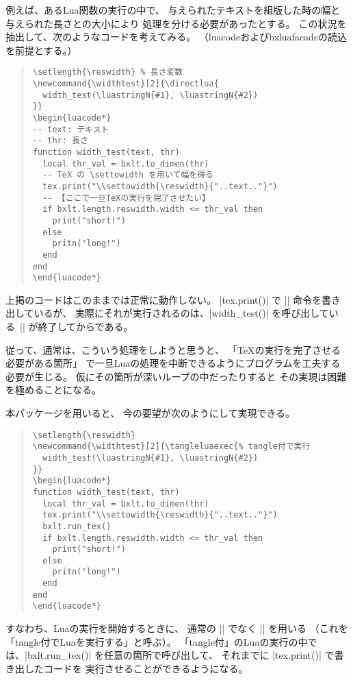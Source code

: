\documentclass[a4paper]{ltjsarticle}
\newcommand{\Pkg}[1]{\textsf{#1}}
\begin{document}
例えば、あるLua関数の実行の中で、
与えられたテキストを組版した時の幅と
与えられた長さとの大小により
処理を分ける必要があったとする。
この状況を抽出して、次のようなコードを考えてみる。
（\Pkg{luacode}および\Pkg{bxluafacade}の読込を前提とする。）

\begin{quote}\small\begin{verbatim}
\setlength{\reswidth} % 長さ変数
\newcommand{\widthtest}[2]{\directlua{
  width_test(\luastringN{#1}, \luastringN{#2})
}}
\begin{luacode*}
-- text: テキスト
-- thr: 長さ
function width_test(text, thr)
  local thr_val = bxlt.to_dimen(thr)
  -- TeX の \settowidth を用いて幅を得る
  tex.print("\\settowidth{\reswidth}{"..text.."}")
  -- 【ここで一旦TeXの実行を完了させたい】
  if bxlt.length.reswidth.width <= thr_val then
    print("short!")
  else
    pritn("long!")
  end
end
\end{luacode*}
\end{verbatim}\end{quote}

上掲のコードはこのままでは正常に動作しない。
|tex.print()| で |\settowidth| 命令を書き出しているが、
実際にそれが実行されるのは、|width_test()| を呼び出している\ 
|\directlua| が終了してからである。

従って、通常は、こういう処理をしようと思うと、
「{\TeX}の実行を完了させる必要がある箇所」
で一旦Luaの処理を中断できるようにプログラムを工夫する
必要が生じる。
仮にその箇所が深いループの中だったりすると
その実現は困難を極めることになる。

本パッケージを用いると、
今の要望が次のようにして実現できる。

\begin{quote}\small\begin{verbatim}
\setlength{\reswidth}
\newcommand{\widthtest}[2]{\tangleluaexec{% tangle付で実行
  width_test(\luastringN{#1}, \luastringN{#2})
}}
\begin{luacode*}
function width_test(text, thr)
  local thr_val = bxlt.to_dimen(thr)
  tex.print("\\settowidth{\reswidth}{"..text.."}")
  bxlt.run_tex()
  if bxlt.length.reswidth.width <= thr_val then
    print("short!")
  else
    pritn("long!")
  end
end
\end{luacode*}
\end{verbatim}\end{quote}

すなわち、Luaの実行を開始するときに、
通常の |\luadirect| でなく |\tangleluaexec| を用いる
（これを「tangle付でLuaを実行する」と呼ぶ）。
「tangle付」のLuaの実行の中では、|bxlt.run_tex()|
を任意の箇所で呼び出して、
それまでに |tex.print()| で書き出したコードを
実行させることができるようになる。
\end{document}
